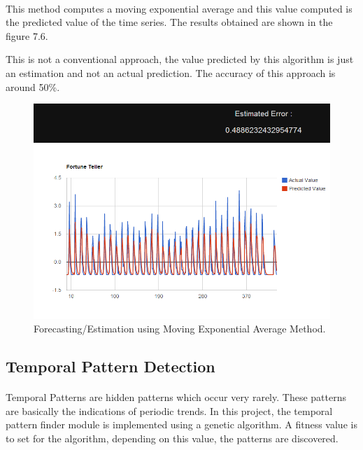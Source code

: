 \documentclass[12pt,a4paper]{report}
\begin{document}
\paragraph{} This method computes a moving exponential average and this value computed is the predicted value of the time series. The results obtained are shown in the figure 7.6.


This is not a conventional approach, the value predicted by this algorithm is just an estimation and not an actual prediction. The accuracy of this approach is around 50\%.
\begin{figure}[h!]
  \centering
    \includegraphics[scale=0.55]{./screenshots/result_fort_MEA.png}
  \caption{Forecasting/Estimation using Moving Exponential Average Method.}
\end{figure}

\subsection{Temporal Pattern Detection}
\paragraph{} Temporal Patterns are hidden patterns which occur very rarely. These patterns are basically the indications of periodic trends. In this project, the temporal pattern finder module is implemented using a genetic algorithm. A fitness value is to set for the algorithm, depending on this value, the patterns are discovered. 
\end{document}

